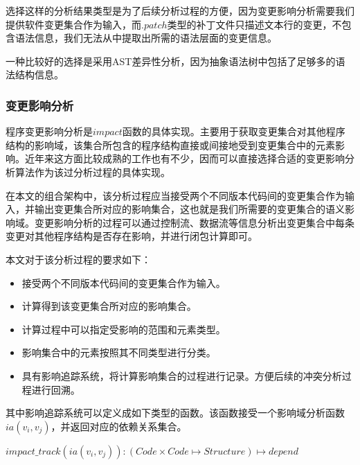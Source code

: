 选择这样的分析结果类型是为了后续分析过程的方便，因为变更影响分析需要我们提供软件变更集合作为输入，而$.patch$类型的补丁文件只描述文本行的变更，不包含语法信息，我们无法从中提取出所需的语法层面的变更信息。

一种比较好的选择是采用AST差异性分析，因为抽象语法树中包括了足够多的语法结构信息。






\subsubsection{变更影响分析}

程序变更影响分析是$impact$函数的具体实现。主要用于获取变更集合对其他程序结构的影响域，该集合所包含的程序结构直接或间接地受到变更集合中的元素影响。近年来这方面比较成熟的工作也有不少，因而可以直接选择合适的变更影响分析算法作为该过分析过程的具体实现。

在本文的组合架构中，该分析过程应当接受两个不同版本代码间的变更集合作为输入，并输出变更集合所对应的影响集合，这也就是我们所需要的变更集合的语义影响域。变更影响分析的过程可以通过控制流、数据流等信息分析出变更集合中每条变更对其他程序结构是否存在影响，并进行闭包计算即可。

本文对于该分析过程的要求如下：
\begin{itemize}
	\item 接受两个不同版本代码间的变更集合作为输入。
	\item 计算得到该变更集合所对应的影响集合。
	\item 计算过程中可以指定受影响的范围和元素类型。
	\item 影响集合中的元素按照其不同类型进行分类。
	\item 具有影响追踪系统，将计算影响集合的过程进行记录。方便后续的冲突分析过程进行回溯。
\end{itemize}

其中影响追踪系统可以定义成如下类型的函数。该函数接受一个影响域分析函数$ia(v_i,v_j)$，并返回对应的依赖关系集合。

\begin{definition}
	$impact\_track(ia(v_i,v_j)):(Code \times Code \mapsto {Structure}) \mapsto {depend}$
\end{definition}


